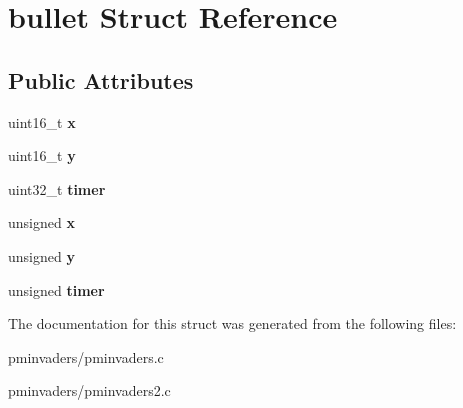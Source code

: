 \hypertarget{structbullet}{}\section{bullet Struct Reference}
\label{structbullet}
\subsection*{Public Attributes}
\begin{DoxyCompactItemize}
\item 
\mbox{\label{structbullet_a5a8ecfe86933fad2966d1184a04761bc}} 
uint16\+\_\+t {\bfseries x}
\item 
\mbox{\label{structbullet_a18437e1768cfa3c7ad25f8e05eecaa2a}} 
uint16\+\_\+t {\bfseries y}
\item 
\mbox{\label{structbullet_a7c980430c22b07baef1df11a472eb3b4}} 
uint32\+\_\+t {\bfseries timer}
\item 
\mbox{\label{structbullet_a2b17fdd1d92d937134ef029ee0eb84b3}} 
unsigned {\bfseries x}
\item 
\mbox{\label{structbullet_ab001bd7da16e0748f2f6847690ce170f}} 
unsigned {\bfseries y}
\item 
\mbox{\label{structbullet_a421e5c55a10cd48e4598c9f761e77b0c}} 
unsigned {\bfseries timer}
\end{DoxyCompactItemize}


The documentation for this struct was generated from the following files\+:\begin{DoxyCompactItemize}
\item 
pminvaders/pminvaders.\+c\item 
pminvaders/pminvaders2.\+c\end{DoxyCompactItemize}
